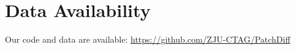 \section{Data Availability}

Our code and data are available: \url{https://github.com/ZJU-CTAG/PatchDiff}
